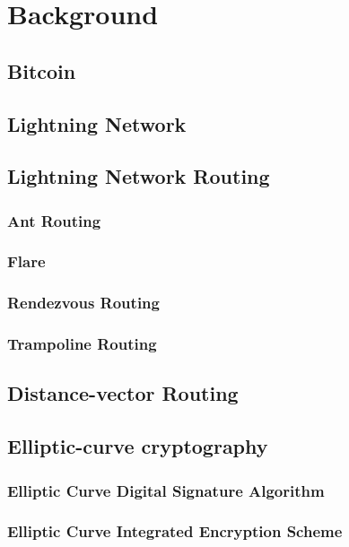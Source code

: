 \section{Background}
\subsection{Bitcoin}
\subsection{Lightning Network}
\subsection{Lightning Network Routing}
\subsubsection{Ant Routing}
\subsubsection{Flare}
\subsubsection{Rendezvous Routing}
\subsubsection{Trampoline Routing}
\label{sssec:trampoline_routing}
\subsection{Distance-vector Routing}
\label{ssec:distancevectorrouting}
\subsection{Elliptic-curve cryptography}
\subsubsection{Elliptic Curve Digital Signature Algorithm}
\subsubsection{Elliptic Curve Integrated Encryption Scheme}